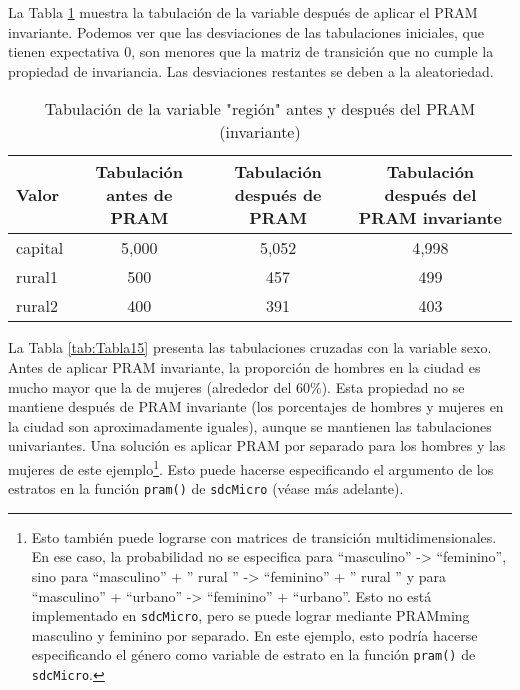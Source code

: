 \documentclass[
]{book}
\theoremstyle{definition}
\theoremstyle{definition}
\theoremstyle{definition}
\theoremstyle{definition}
\theoremstyle{remark}
\begin{document}
La Tabla \ref{tab:Tabla14} muestra la tabulación de la variable después de aplicar el PRAM invariante. Podemos ver que las desviaciones de las tabulaciones iniciales, que tienen expectativa 0, son menores que la matriz de transición que no cumple la propiedad de invariancia. Las desviaciones restantes se deben a la aleatoriedad.

\begin{table}

\caption{\label{tab:Tabla14}\label{tab:Tabla14}Tabulación de la variable "región" antes y después del PRAM (invariante)}
\centering
\begin{tabular}[t]{lccc}
\toprule
Valor & Tabulación antes de PRAM & Tabulación después de PRAM & Tabulación después del PRAM invariante\\
\midrule
capital & 5,000 & 5,052 & 4,998\\
rural1 & 500 & 457 & 499\\
rural2 & 400 & 391 & 403\\
\bottomrule
\end{tabular}
\end{table}

La Tabla \ref{tab:Tabla15} presenta las tabulaciones cruzadas con la variable sexo. Antes de aplicar PRAM invariante, la proporción de hombres en la ciudad es mucho mayor que la de mujeres (alrededor del 60\%). Esta propiedad no se mantiene después de PRAM invariante (los porcentajes de hombres y mujeres en la ciudad son aproximadamente iguales), aunque se mantienen las tabulaciones univariantes. Una solución es aplicar PRAM por separado para los hombres y las mujeres de este ejemplo\footnote{Esto también puede lograrse con matrices de transición multidimensionales. En ese caso, la probabilidad no se especifica para ``masculino'' -\textgreater{} ``feminino'', sino para ``masculino'' + '' rural '' -\textgreater{} ``feminino'' + '' rural '' y para ``masculino'' + ``urbano'' -\textgreater{} ``feminino'' + ``urbano''. Esto no está implementado en \texttt{sdcMicro}, pero se puede lograr mediante PRAMming masculino y feminino por separado. En este ejemplo, esto podría hacerse especificando el género como variable de estrato en la función \texttt{pram()} de \texttt{sdcMicro}.}. Esto puede hacerse especificando el argumento de los estratos en la función \texttt{pram()} de \texttt{sdcMicro} (véase más adelante).
\end{document}
